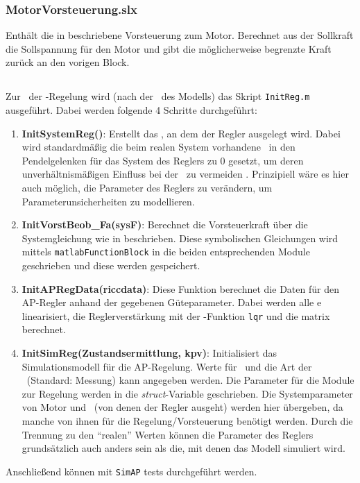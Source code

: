 \subsubsection{MotorVorsteuerung.slx}
Enthält die in  beschriebene Vorsteuerung zum Motor.
Berechnet aus der Sollkraft die Sollspannung für den Motor und gibt die möglicherweise begrenzte Kraft zurück an den vorigen Block.

\subsection{\init}

Zur \init\ der \ap-Regelung wird (nach der \init\ des Modells) das Skript \texttt{InitReg.m} ausgeführt.
Dabei werden folgende 4 Schritte durchgeführt:
\begin{enumerate}
	\item \textbf{InitSystemReg()}: Erstellt das \zrm, an dem der Regler ausgelegt wird. Dabei wird standardmäßig die beim realen System vorhandene \crb\ in den Pendelgelenken für das System des Reglers zu 0 gesetzt, um deren unverhältnismäßigen Einfluss bei der \lin\ zu vermeiden . Prinzipiell wäre es hier auch möglich, die Parameter des Reglers zu verändern, um Parameterunsicherheiten zu modellieren.
	\item \textbf{InitVorstBeob\_Fa(sysF)}: Berechnet die Vorsteuerkraft über die Systemgleichung wie in  beschrieben. Diese symbolischen Gleichungen wird mittels \texttt{matlabFunctionBlock} in die beiden entsprechenden Module geschrieben und diese werden gespeichert. 
	\item \textbf{InitAPRegData(riccdata)}: Diese Funktion berechnet die Daten für den AP-Regler anhand der gegebenen Güteparameter. Dabei werden alle \ap e linearisiert, die Reglerverstärkung mit der \ml-Funktion \texttt{lqr} und die \beob matrix berechnet.
	\item \textbf{InitSimReg(Zustandsermittlung, kpv)}: Initialisiert das Simulationsmodell für die AP-Regelung. Werte für \kpv\ und die Art der \ze\ (Standard: Messung) kann angegeben werden. Die Parameter für die Module zur Regelung werden in die \emph{struct}-Variable  geschrieben. Die Systemparameter von Motor und \spd\ (von denen der Regler ausgeht) werden hier übergeben, da manche von ihnen für die Regelung/Vorsteuerung benötigt werden. Durch die Trennung zu den "`realen"' Werten  können die Parameter des Reglers grundsätzlich auch anders sein als die, mit denen das Modell simuliert wird.
\end{enumerate}
Anschließend können mit \texttt{SimAP} \ap tests durchgeführt werden.


